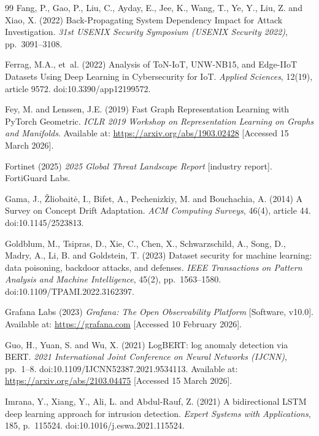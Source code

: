 \documentclass[12pt,a4paper]{report}
\begin{document}
\begin{thebibliography}{99}
Fang, P., Gao, P., Liu, C., Ayday, E., Jee, K., Wang, T., Ye, Y., Liu, Z. and Xiao, X. (2022) Back-Propagating System Dependency Impact for Attack Investigation. \textit{31st USENIX Security Symposium (USENIX Security 2022)}, pp.~3091--3108.

Ferrag, M.A., et~al. (2022) Analysis of ToN-IoT, UNW-NB15, and Edge-IIoT Datasets Using Deep Learning in Cybersecurity for IoT. \textit{Applied Sciences}, 12(19), article 9572. doi:10.3390/app12199572.

Fey, M. and Lenssen, J.E. (2019) Fast Graph Representation Learning with PyTorch Geometric. \textit{ICLR 2019 Workshop on Representation Learning on Graphs and Manifolds}. Available at: \url{https://arxiv.org/abs/1903.02428} [Accessed 15 March 2026].

Fortinet (2025) \textit{2025 Global Threat Landscape Report} [industry report]. FortiGuard Labs.

Gama, J., \v{Z}liobait\.{e}, I., Bifet, A., Pechenizkiy, M. and Bouchachia, A. (2014) A Survey on Concept Drift Adaptation. \textit{ACM Computing Surveys}, 46(4), article 44. doi:10.1145/2523813.

Goldblum, M., Tsipras, D., Xie, C., Chen, X., Schwarzschild, A., Song, D., Madry, A., Li, B. and Goldstein, T. (2023) Dataset security for machine learning: data poisoning, backdoor attacks, and defenses. \textit{IEEE Transactions on Pattern Analysis and Machine Intelligence}, 45(2), pp.~1563--1580. doi:10.1109/TPAMI.2022.3162397.

Grafana Labs (2023) \textit{Grafana: The Open Observability Platform} [Software, v10.0]. Available at: \url{https://grafana.com} [Accessed 10 February 2026].

Guo, H., Yuan, S. and Wu, X. (2021) LogBERT: log anomaly detection via BERT. \textit{2021 International Joint Conference on Neural Networks (IJCNN)}, pp.~1--8. doi:10.1109/IJCNN52387.2021.9534113. Available at: \url{https://arxiv.org/abs/2103.04475} [Accessed 15 March 2026].

Imrana, Y., Xiang, Y., Ali, L. and Abdul-Rauf, Z. (2021) A bidirectional LSTM deep learning approach for intrusion detection. \textit{Expert Systems with Applications}, 185, p.~115524. doi:10.1016/j.eswa.2021.115524.


\end{thebibliography}
\end{document}
